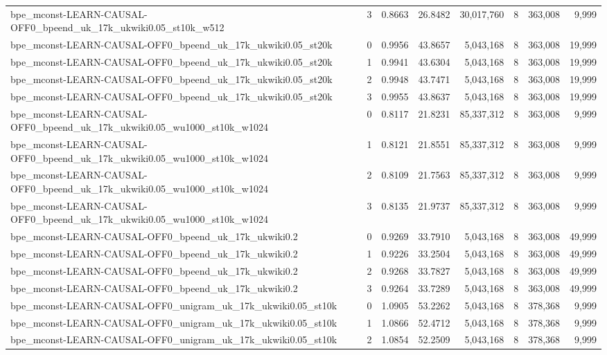 \begin{tabular}{lrrrrrrr}
bpe\_mconst-LEARN-CAUSAL-OFF0\_bpeend\_uk\_17k\_ukwiki0.05\_st10k\_w512 & 3 & 0.8663 & 26.8482 & 30,017,760 & 8 & 363,008 & 9,999 \\
bpe\_mconst-LEARN-CAUSAL-OFF0\_bpeend\_uk\_17k\_ukwiki0.05\_st20k & 0 & 0.9956 & 43.8657 & 5,043,168 & 8 & 363,008 & 19,999 \\
bpe\_mconst-LEARN-CAUSAL-OFF0\_bpeend\_uk\_17k\_ukwiki0.05\_st20k & 1 & 0.9941 & 43.6304 & 5,043,168 & 8 & 363,008 & 19,999 \\
bpe\_mconst-LEARN-CAUSAL-OFF0\_bpeend\_uk\_17k\_ukwiki0.05\_st20k & 2 & 0.9948 & 43.7471 & 5,043,168 & 8 & 363,008 & 19,999 \\
bpe\_mconst-LEARN-CAUSAL-OFF0\_bpeend\_uk\_17k\_ukwiki0.05\_st20k & 3 & 0.9955 & 43.8637 & 5,043,168 & 8 & 363,008 & 19,999 \\
bpe\_mconst-LEARN-CAUSAL-OFF0\_bpeend\_uk\_17k\_ukwiki0.05\_wu1000\_st10k\_w1024 & 0 & 0.8117 & 21.8231 & 85,337,312 & 8 & 363,008 & 9,999 \\
bpe\_mconst-LEARN-CAUSAL-OFF0\_bpeend\_uk\_17k\_ukwiki0.05\_wu1000\_st10k\_w1024 & 1 & 0.8121 & 21.8551 & 85,337,312 & 8 & 363,008 & 9,999 \\
bpe\_mconst-LEARN-CAUSAL-OFF0\_bpeend\_uk\_17k\_ukwiki0.05\_wu1000\_st10k\_w1024 & 2 & 0.8109 & 21.7563 & 85,337,312 & 8 & 363,008 & 9,999 \\
bpe\_mconst-LEARN-CAUSAL-OFF0\_bpeend\_uk\_17k\_ukwiki0.05\_wu1000\_st10k\_w1024 & 3 & 0.8135 & 21.9737 & 85,337,312 & 8 & 363,008 & 9,999 \\
bpe\_mconst-LEARN-CAUSAL-OFF0\_bpeend\_uk\_17k\_ukwiki0.2 & 0 & 0.9269 & 33.7910 & 5,043,168 & 8 & 363,008 & 49,999 \\
bpe\_mconst-LEARN-CAUSAL-OFF0\_bpeend\_uk\_17k\_ukwiki0.2 & 1 & 0.9226 & 33.2504 & 5,043,168 & 8 & 363,008 & 49,999 \\
bpe\_mconst-LEARN-CAUSAL-OFF0\_bpeend\_uk\_17k\_ukwiki0.2 & 2 & 0.9268 & 33.7827 & 5,043,168 & 8 & 363,008 & 49,999 \\
bpe\_mconst-LEARN-CAUSAL-OFF0\_bpeend\_uk\_17k\_ukwiki0.2 & 3 & 0.9264 & 33.7289 & 5,043,168 & 8 & 363,008 & 49,999 \\
bpe\_mconst-LEARN-CAUSAL-OFF0\_unigram\_uk\_17k\_ukwiki0.05\_st10k & 0 & 1.0905 & 53.2262 & 5,043,168 & 8 & 378,368 & 9,999 \\
bpe\_mconst-LEARN-CAUSAL-OFF0\_unigram\_uk\_17k\_ukwiki0.05\_st10k & 1 & 1.0866 & 52.4712 & 5,043,168 & 8 & 378,368 & 9,999 \\
bpe\_mconst-LEARN-CAUSAL-OFF0\_unigram\_uk\_17k\_ukwiki0.05\_st10k & 2 & 1.0854 & 52.2509 & 5,043,168 & 8 & 378,368 & 9,999 \\

\end{tabular}
